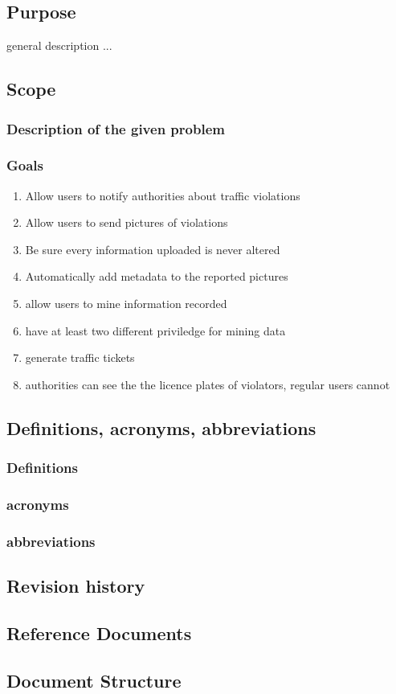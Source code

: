 

\subsection{Purpose}
general description ...

\subsection{Scope}

\subsubsection{Description of the given problem}


\subsubsection{Goals}
\begin{enumerate}[label=E]
  \item Allow users to notify authorities about traffic violations
  \item Allow users to send pictures of violations
  \item Be sure every information uploaded is never altered
  \item Automatically add metadata to the reported pictures
  \item allow users to mine information recorded
  \item have at least two different  priviledge for mining data
  \item generate traffic tickets
  \item authorities can see the the licence plates of violators, regular users cannot

\end{enumerate}



\subsection{Definitions,  acronyms,  abbreviations}
\subsubsection{Definitions}
\subsubsection{acronyms}
\subsubsection{abbreviations}


\subsection{Revision history}


\subsection{Reference Documents}


\subsection{Document Structure}
